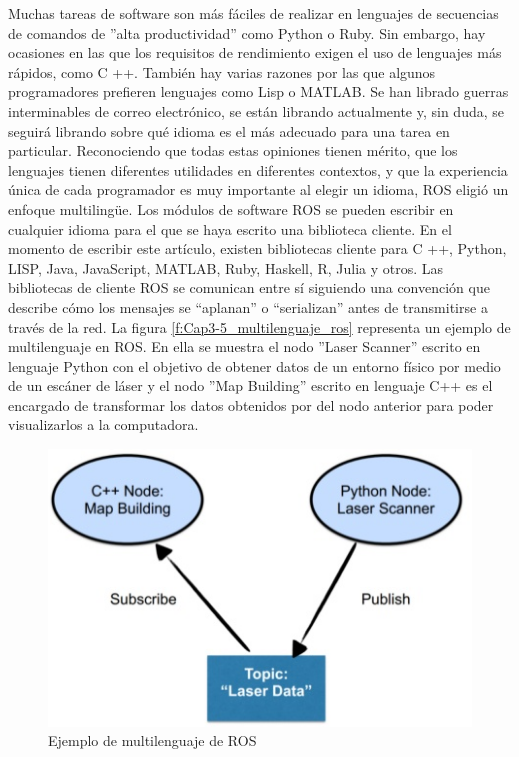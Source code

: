             Muchas tareas de software son más fáciles de realizar en lenguajes de secuencias de comandos de ''alta productividad'' como Python o Ruby. Sin embargo, hay ocasiones en las que los requisitos de rendimiento exigen el uso de lenguajes más rápidos, como C ++. También hay varias razones por las que algunos programadores prefieren lenguajes como Lisp o MATLAB. Se han librado guerras interminables de correo electrónico, se están librando actualmente y, sin duda, se seguirá librando sobre qué idioma es el más adecuado para una tarea en particular. Reconociendo que todas estas opiniones tienen mérito, que los lenguajes tienen diferentes utilidades en diferentes contextos, y que la experiencia única de cada programador es muy importante al elegir un idioma, ROS eligió un enfoque multilingüe. Los módulos de software ROS se pueden escribir en cualquier idioma para el que se haya escrito una biblioteca cliente. En el momento de escribir este artículo, existen bibliotecas cliente para C ++, Python, LISP, Java, JavaScript, MATLAB, Ruby, Haskell, R, Julia y otros. Las bibliotecas de cliente ROS se comunican entre sí siguiendo una convención que describe cómo los mensajes se ``aplanan'' o ``serializan'' antes de transmitirse a través de la red. La figura \eqref{f:Cap3-5_multilenguaje_ros} representa un ejemplo de multilenguaje en ROS. En ella se muestra el nodo ''Laser Scanner'' escrito en lenguaje Python con el objetivo de obtener datos de un entorno físico por medio de un escáner de láser y el nodo ''Map Building'' escrito en lenguaje C++ es el encargado de transformar los datos obtenidos por del nodo anterior para poder visualizarlos a la computadora.     
            
            \begin{figure}[htb]
                \centering
                \includegraphics[width=0.5\linewidth]{Main/Chapter3/Images3/multilenguaje_1.png}
                \caption{Ejemplo de multilenguaje de ROS}
                \label{f:Cap3-5_multilenguaje_ros}
            \end{figure}

